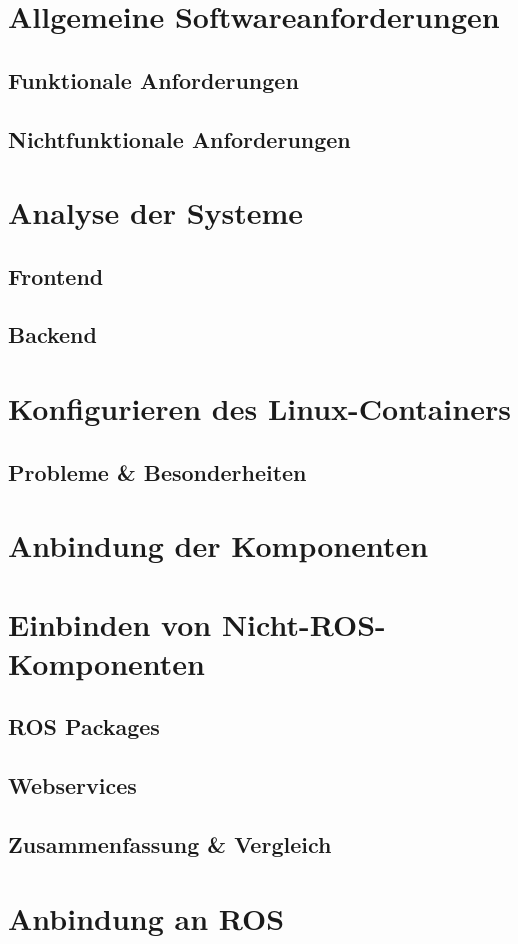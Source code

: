 

\section{Allgemeine Softwareanforderungen}


\subsection{Funktionale Anforderungen}


\subsection{Nichtfunktionale Anforderungen}


\section{Analyse der Systeme}


\subsection{Frontend}


\subsection{Backend}


\section{Konfigurieren des Linux-Containers}



\subsection{Probleme \& Besonderheiten}


\section{Anbindung der Komponenten}




\section{Einbinden von Nicht-ROS-Komponenten}


\subsection{ROS Packages}


\subsection{Webservices}




\subsection{Zusammenfassung \& Vergleich}


\section{Anbindung an ROS}
